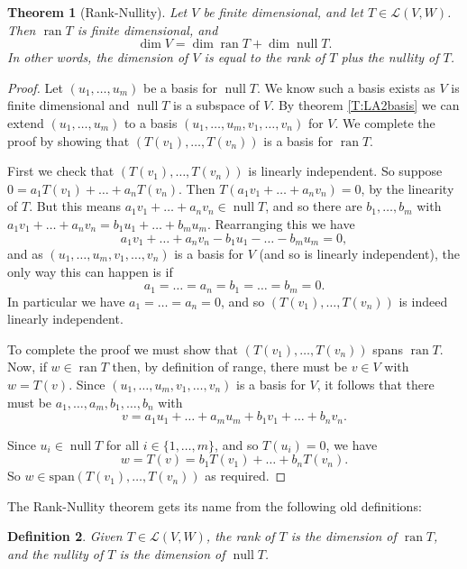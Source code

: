 \documentclass{article}
\theoremstyle{plain}
\newtheorem{theorem}{Theorem}[section]{\bfseries}{\itshape}
\newtheorem{definition}[theorem]{Definition}{\bfseries}{\upshape}
\newcommand{\spa}{\mathrm{span}}
\newcommand{\cL}{\mathcal{L}}
\DeclareMathOperator{\nul}{\mathrm{null}}
\DeclareMathOperator{\ran}{\mathrm{ran}}
\begin{document}
\begin{theorem}[Rank-Nullity]
Let $V$ be finite dimensional, and let $T\in\cL(V,W)$. Then $\ran T$ is finite dimensional, and
\[\dim V = \dim \ran T + \dim \nul T.\]
In other words, the dimension of $V$ is equal to the rank of $T$ plus the nullity of $T$.
\end{theorem}
\begin{proof}
Let $(u_1,\ldots,u_m)$ be a basis for $\nul T$. We know such a basis exists as $V$ is finite dimensional and $\nul T$ is a subspace of $V$. By theorem \ref{T:LA2basis} we can extend $(u_1,\ldots,u_m)$ to a basis $(u_1,\ldots,u_m,v_1,\ldots,v_n)$ for $V$. We complete the proof by showing that $(T(v_1),\ldots, T(v_n))$ is a basis for $\ran T$. 

First we check that $(T(v_1),\ldots, T(v_n))$ is linearly independent. So suppose $0 = a_1T(v_1)+\ldots + a_n T(v_n)$. Then $T(a_1v_1+\ldots +a_n v_n) = 0$, by the linearity of $T$. But this means $a_1v_1+\ldots +a_n v_n\in \nul T$, and so there are $b_1,\ldots, b_m$ with $a_1v_1+\ldots +a_n v_n = b_1u_1+\ldots + b_m u_m$. Rearranging this we have 
\[a_1v_1+\ldots +a_n v_n - b_1u_1-\ldots - b_m u_m = 0,\] 
and as $(u_1,\ldots,u_m,v_1,\ldots,v_n)$ is a basis for $V$ (and so is linearly independent), the only way this can happen is if 
\[a_1=\ldots =a_n = b_1=\ldots = b_m = 0.\] 
In particular we have $a_1=\ldots =a_n = 0$, and so $(T(v_1),\ldots, T(v_n))$ is indeed linearly independent.

To complete the proof we must show that $(T(v_1),\ldots, T(v_n))$ spans $\ran T$. Now, if $w\in \ran T$ then, by definition of range, there must be $v\in V$ with $w = T(v)$. Since $(u_1,\ldots,u_m,v_1,\ldots,v_n)$ is a basis for $V$, it follows that there must be $a_1,\ldots,a_m,b_1,\ldots,b_n$ with 
\[v = a_1u_1 + \ldots + a_mu_m+ b_1 v_1+\ldots + b_n v_n.\] 

Since $u_i\in \nul T$ for all $i\in\{1,\ldots,m\}$, and so $T(u_i)=0$, we have 
\[w = T(v) = b_1T(v_1)+\ldots + b_n T(v_n).\] 
So $w\in \spa(T(v_1),\ldots, T(v_n))$ as required. 
\end{proof} 

The Rank-Nullity theorem gets its name from the following old definitions:

\begin{definition}\label{D:LA3RN}
Given $T\in\cL(V,W)$, the \emph{rank} of $T$  is the dimension of $\ran T$, and the \emph{nullity} of $T$ is the dimension of $\nul T$.
\end{definition}
\end{document}
